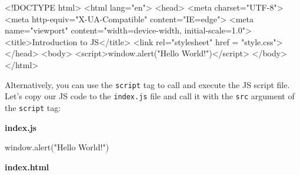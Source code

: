 \documentclass[
  letterpaper,
  DIV=11,
  numbers=noendperiod]{scrreprt}
\newenvironment{Shaded}{\begin{snugshade}}{\end{snugshade}}
\newcommand{\BuiltInTok}[1]{\textcolor[rgb]{0.00,0.23,0.31}{#1}}
\newcommand{\DataTypeTok}[1]{\textcolor[rgb]{0.68,0.00,0.00}{#1}}
\newcommand{\ErrorTok}[1]{\textcolor[rgb]{0.68,0.00,0.00}{#1}}
\newcommand{\FunctionTok}[1]{\textcolor[rgb]{0.28,0.35,0.67}{#1}}
\newcommand{\KeywordTok}[1]{\textcolor[rgb]{0.00,0.23,0.31}{#1}}
\newcommand{\NormalTok}[1]{\textcolor[rgb]{0.00,0.23,0.31}{#1}}
\newcommand{\OperatorTok}[1]{\textcolor[rgb]{0.37,0.37,0.37}{#1}}
\newcommand{\OtherTok}[1]{\textcolor[rgb]{0.00,0.23,0.31}{#1}}
\newcommand{\StringTok}[1]{\textcolor[rgb]{0.13,0.47,0.30}{#1}}
\begin{document}
\begin{Shaded}
\begin{Highlighting}[]
\DataTypeTok{\textless{}!DOCTYPE }\NormalTok{html}\DataTypeTok{\textgreater{}}
\KeywordTok{\textless{}html} \ErrorTok{lang}\OtherTok{=}\StringTok{"en"}\KeywordTok{\textgreater{}}
\KeywordTok{\textless{}head\textgreater{}}
    \KeywordTok{\textless{}meta} \ErrorTok{charset}\OtherTok{=}\StringTok{"UTF{-}8"}\KeywordTok{\textgreater{}}
    \KeywordTok{\textless{}meta} \ErrorTok{http{-}equiv}\OtherTok{=}\StringTok{"X{-}UA{-}Compatible"} \ErrorTok{content}\OtherTok{=}\StringTok{"IE=edge"}\KeywordTok{\textgreater{}}
    \KeywordTok{\textless{}meta} \ErrorTok{name}\OtherTok{=}\StringTok{"viewport"} \ErrorTok{content}\OtherTok{=}\StringTok{"width=device{-}width, initial{-}scale=1.0"}\KeywordTok{\textgreater{}}
    \KeywordTok{\textless{}title\textgreater{}}\NormalTok{Introduction to JS}\KeywordTok{\textless{}/title\textgreater{}}
    \KeywordTok{\textless{}link} \ErrorTok{rel}\OtherTok{=}\StringTok{"stylesheet"} \ErrorTok{href} \OtherTok{=} \StringTok{"style.css"}\KeywordTok{\textgreater{}}
\KeywordTok{\textless{}/head\textgreater{}}
\KeywordTok{\textless{}body\textgreater{}}
    \KeywordTok{\textless{}script\textgreater{}}\BuiltInTok{window}\OperatorTok{.}\FunctionTok{alert}\NormalTok{(}\StringTok{"Hello World!"}\NormalTok{)}\KeywordTok{\textless{}/script\textgreater{}}
\KeywordTok{\textless{}/body\textgreater{}}
\KeywordTok{\textless{}/html\textgreater{}}
\end{Highlighting}
\end{Shaded}

Alternatively, you can use the \texttt{script} tag to call and execute
the JS script file. Let's copy our JS code to the \texttt{index.js} file
and call it with the \texttt{src} argument of the \texttt{script} tag:

\textbf{index.js}

\begin{Shaded}
\begin{Highlighting}[]
\BuiltInTok{window}\OperatorTok{.}\FunctionTok{alert}\NormalTok{(}\StringTok{"Hello World!"}\NormalTok{)}
\end{Highlighting}
\end{Shaded}

\textbf{index.html}
\end{document}

